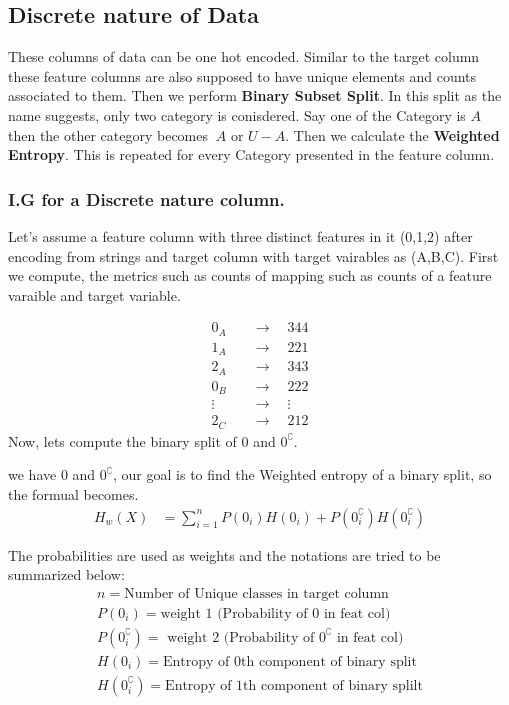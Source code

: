 \documentclass[12pt,letterpaper]{article}
\begin{document}
\subsection{Discrete nature of Data}
These columns of data can be one hot encoded. Similar to the target column these feature columns are also supposed to have unique elements and counts associated to them. Then we perform \textbf{Binary Subset Split}. In this split as the name suggests, only two category is conisdered. Say one of the Category is $A$ then the other category becomes $~A$ or $U-A$. Then we calculate the \textbf{Weighted Entropy}. This is repeated for every Category presented in the feature column.

\subsubsection{I.G for a Discrete nature column.}
Let's assume a feature column with three distinct features in it (0,1,2) after encoding from strings and target column with target vairables as (A,B,C). First we compute, the metrics such as counts of mapping such as counts of a feature varaible and target variable.

\begin{align*}
    0_A \quad &\longrightarrow \quad 344 \\
    1_A \quad &\longrightarrow \quad 221 \\
    2_A \quad &\longrightarrow \quad 343 \\
    0_B \quad &\longrightarrow \quad 222 \\
    \vdots \quad &\longrightarrow \quad \vdots \\
    2_C \quad &\longrightarrow \quad 212
\end{align*}
Now, lets compute the binary split of $0$ and $0^{\complement}$.

we have $0$ and $0^{\complement}$, our goal is to find the Weighted entropy of a binary split, so the formual becomes.
\begin{align*}
    H_w(X) &= \sum_{i=1}^{n} P(0_i) H(0_i) + P(0^{\complement}_i)H(0^{\complement}_i) 
\end{align*}

The probabilities are used as weights and the notations are tried to be summarized below:
\begin{align*}
    n = \text{Number of Unique classes in target column} \\
    P(0_i) = \text{weight 1 (Probability of 0 in feat col)}\\
    P(0^{\complement}_i) = \text{ weight 2 (Probability of $0^{\complement}$ in feat col)}\\
    H(0_i) = \text{Entropy of 0th component of binary split}\\
    H(0^{\complement}_i) = \text{Entropy of 1th component of binary splilt} 
\end{align*}
\end{document}

